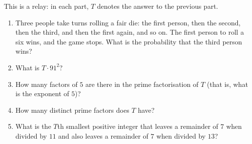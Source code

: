 This is a relay: in each part, $T$ denotes the answer to the previous part.
\begin{enumerate}
\item Three people take turns rolling a fair die: the first person, then the second, then the third, and then the first again, and so on. The first person to roll a six wins, and the game stops. What is the probability that the third person wins?
\item What is $T\cdot91^2$?
\item How many factors of $5$ are there in the prime factorisation of $T$ (that is, what is the exponent of $5$)?
\item How many distinct prime factors does $T$ have?
\item What is the $T$th smallest positive integer that leaves a remainder of $7$ when divided by $11$ and also leaves a remainder of $7$ when divided by $13$?
\end{enumerate}
